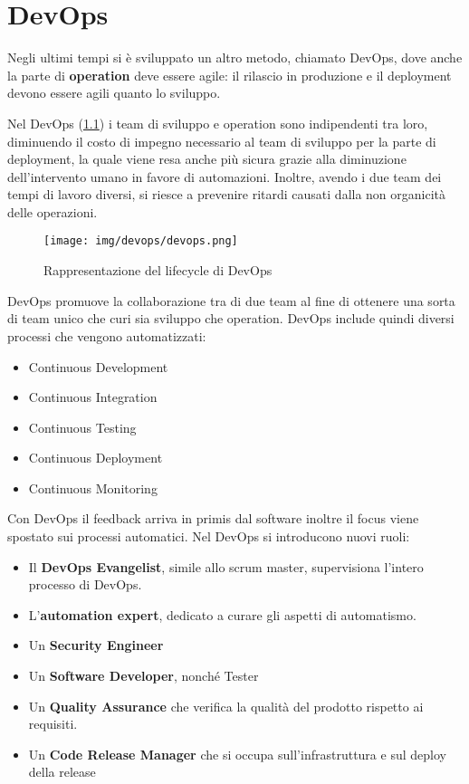 \chapter{DevOps}
Negli ultimi tempi si è sviluppato un altro metodo, chiamato DevOps, dove anche
la parte di \textbf{operation} deve essere agile: il rilascio in produzione e il
deployment devono essere agili quanto lo
sviluppo.

Nel DevOps (\ref{fig:devops}) i team di sviluppo e operation sono indipendenti
tra loro, diminuendo il costo di impegno necessario al team di sviluppo per la parte
di deployment, la quale viene resa anche più sicura grazie alla diminuzione
dell'intervento umano in favore di automazioni. Inoltre, avendo i due team dei
tempi di lavoro diversi, si riesce a prevenire ritardi causati dalla non
organicità delle operazioni.

\begin{figure}[!ht]
    \centering
    \texttt{[image: img/devops/devops.png]}
    \caption{Rappresentazione del lifecycle di DevOps}
    \label{fig:devops}
\end{figure}

DevOps promuove la collaborazione tra di due team al fine di ottenere una sorta
di team unico che curi sia sviluppo che operation. DevOps include quindi diversi
processi che vengono automatizzati:
\begin{itemize}
    \item Continuous Development
    \item Continuous Integration
    \item Continuous Testing
    \item Continuous Deployment
    \item Continuous Monitoring
\end{itemize}

Con DevOps il feedback arriva in primis dal software inoltre il focus viene
spostato sui processi automatici. Nel DevOps si introducono nuovi ruoli:
\begin{itemize}
    \item Il \textbf{DevOps Evangelist}, simile allo scrum master, supervisiona
          l'intero processo di DevOps.
    \item L'\textbf{automation expert}, dedicato a curare gli aspetti di automatismo.
    \item Un \textbf{Security Engineer}
    \item Un \textbf{Software Developer}, nonché Tester
    \item Un \textbf{Quality Assurance} che verifica la qualità del prodotto
          rispetto ai requisiti.
    \item Un\textbf{ Code Release Manager} che si occupa sull'infrastruttura e
          sul deploy della release
\end{itemize}

